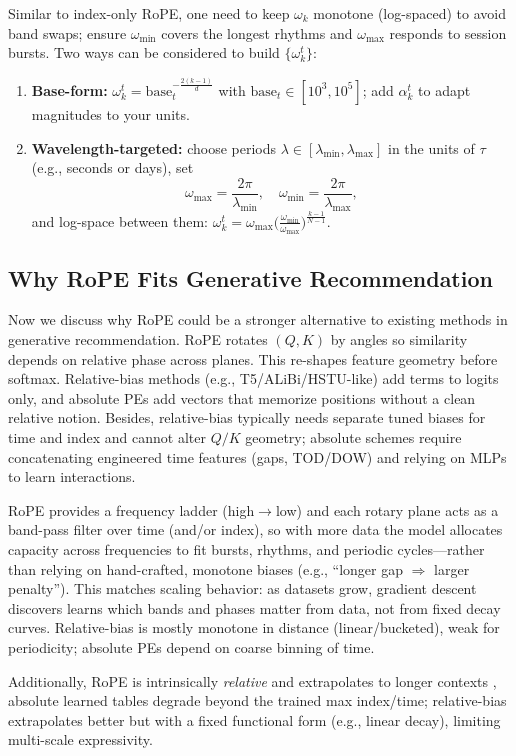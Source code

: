 \documentclass[sigconf]{acmart}
\begin{document}
Similar to index-only RoPE, one need to keep $\omega_k$ monotone (log-spaced) to avoid band swaps; ensure $\omega_{\min}$ covers the longest rhythms and $\omega_{\max}$ responds to session bursts. Two ways can be considered to build $\{\omega^t_k\}$:
\begin{enumerate}
\item \textbf{Base-form:} 
$\omega^t_k=\text{base}_{t}^{-\frac{2(k-1)}{d}}$ with $\text{base}_t\!\in\![10^3,10^5]$; add $\alpha^t_k$ to adapt magnitudes to your units.
\item \textbf{Wavelength-targeted:} choose periods $\lambda\in[\lambda_{\min},\lambda_{\max}]$ in the units of $\tau$ (e.g., seconds or days), set
\[
\omega_{\max}=\frac{2\pi}{\lambda_{\min}},\quad \omega_{\min}=\frac{2\pi}{\lambda_{\max}},
\]
and log-space between them:
$\omega^t_k=\omega_{\max}\big(\tfrac{\omega_{\min}}{\omega_{\max}}\big)^{\frac{k-1}{N-1}}$.
\end{enumerate}


\subsection{Why RoPE Fits Generative Recommendation}
Now we discuss why RoPE could be a stronger alternative to existing methods in generative recommendation. RoPE rotates $(Q,K)$ by angles so similarity depends on relative phase across planes. This re-shapes feature geometry before softmax. Relative-bias methods (e.g., T5/ALiBi/HSTU-like) add terms to logits only, and absolute PEs add vectors that memorize positions without a clean relative notion. Besides, relative-bias typically needs separate tuned biases for time and index and cannot alter $Q/K$ geometry; absolute schemes require concatenating engineered time features (gaps, TOD/DOW) and relying on MLPs to learn interactions.

RoPE provides a frequency ladder (high$\rightarrow$low) and each rotary plane acts as a band-pass filter over time (and/or index), so with more data the model allocates capacity across frequencies to fit bursts, rhythms, and periodic cycles—rather than relying on hand-crafted, monotone biases (e.g., “longer gap $\Rightarrow$ larger penalty”). This matches scaling behavior: as datasets grow, gradient descent discovers learns which bands and phases matter from data, not from fixed decay curves. Relative-bias is mostly monotone in distance (linear/bucketed), weak for periodicity; absolute PEs depend on coarse binning of time.


Additionally, RoPE is intrinsically \emph{relative} and extrapolates to longer contexts \cite{Peng2023YaRNEC}, absolute learned tables degrade beyond the trained max index/time; relative-bias extrapolates better but with a fixed functional form (e.g., linear decay), limiting multi-scale expressivity. 
\end{document}
